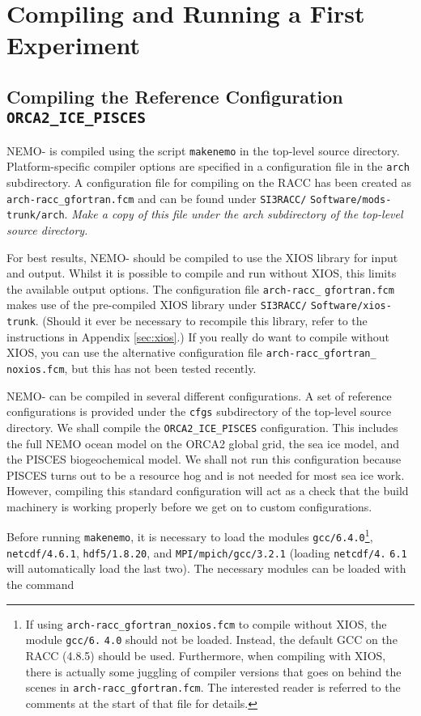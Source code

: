\section{Compiling and Running a First Experiment}
\label{sec:tutorial}

\subsection{Compiling the Reference Configuration \texorpdfstring{\texttt{ORCA2\_ICE\_PISCES}}{ORCA2 ICE PISCES}}
\label{sec:tutorial:subsec:compiling}

NEMO-\SIcu{} is compiled using the script \verb|makenemo| in the top-level source directory.
Platform-specific compiler options are specified in a configuration file in the \verb|arch| subdirectory.
A configuration file for compiling on the RACC has been created as \verb|arch-racc_gfortran.fcm| and can be found under \verb|SI3RACC/| \verb|Software/mods-trunk/arch|.
\textit{Make a copy of this file under the arch subdirectory of the top-level source directory.}

For best results, NEMO-\SIcu{} should be compiled to use the XIOS library for input and output.
Whilst it is possible to compile and run without XIOS, this limits the available output options.
The configuration file \verb|arch-racc_| \verb|gfortran.fcm| makes use of the pre-compiled XIOS library under \verb|SI3RACC/| \verb|Software/xios-trunk|.
(Should it ever be necessary to recompile this library, refer to the instructions in Appendix \ref{sec:xios}.)
If you really do want to compile without XIOS, you can use the alternative configuration file \verb|arch-racc_gfortran_| \verb|noxios.fcm|, but this has not been tested recently.

NEMO-\SIcu{} can be compiled in several different configurations.
A set of reference configurations is provided under the \verb|cfgs| subdirectory of the top-level source directory.
We shall compile the \verb|ORCA2_ICE_PISCES| configuration.
This includes the full NEMO ocean model on the ORCA2 global grid, the \SIcu{} sea ice model, and the PISCES biogeochemical model.
We shall not run this configuration because PISCES turns out to be a resource hog and is not needed for most sea ice work.
However, compiling this standard configuration will act as a check that the build machinery is working properly before we get on to custom configurations.

Before running \verb|makenemo|, it is necessary to load the modules \verb|gcc/6.4.0|\footnote{
    If using \texttt{arch-racc\_gfortran\_noxios.fcm} to compile without XIOS, the module \texttt{gcc/6.} \texttt{4.0} should not be loaded.
    Instead, the default GCC on the RACC (4.8.5) should be used.
    Furthermore, when compiling with XIOS, there is actually some juggling of compiler versions that goes on behind the scenes in \texttt{arch-racc\_gfortran.fcm}.
    The interested reader is referred to the comments at the start of that file for details.
}, \verb|netcdf/4.6.1|, \verb|hdf5/1.8.20|, and \verb|MPI/mpich/gcc/3.2.1| (loading \verb|netcdf/4.| \verb|6.1| will automatically load the last two).
The necessary modules can be loaded with the command

